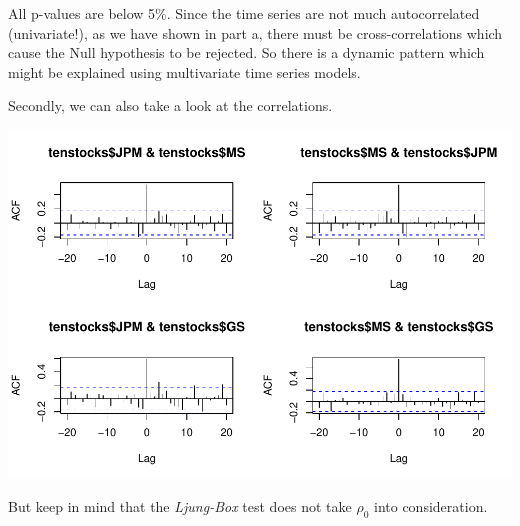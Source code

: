 \documentclass[12pt,a4paper]{article}
\newenvironment{Shaded}{\begin{snugshade}}{\end{snugshade}}
\newcommand{\DataTypeTok}[1]{\textcolor[rgb]{0.13,0.29,0.53}{#1}}
\newcommand{\DecValTok}[1]{\textcolor[rgb]{0.00,0.00,0.81}{#1}}
\newcommand{\KeywordTok}[1]{\textcolor[rgb]{0.13,0.29,0.53}{\textbf{#1}}}
\newcommand{\NormalTok}[1]{#1}
\newcommand{\OperatorTok}[1]{\textcolor[rgb]{0.81,0.36,0.00}{\textbf{#1}}}
\begin{document}
All p-values are below 5\%. Since the time series are not much
autocorrelated (univariate!), as we have shown in part a, there must be
cross-correlations which cause the Null hypothesis to be rejected. So
there is a dynamic pattern which might be explained using multivariate
time series models.

Secondly, we can also take a look at the correlations.

\begin{Shaded}
\end{Shaded}

\includegraphics{exercise_1_files/figure-latex/unnamed-chunk-8-1.pdf}

But keep in mind that the \emph{Ljung-Box} test does not take \(\rho_0\)
into consideration.
\end{document}
